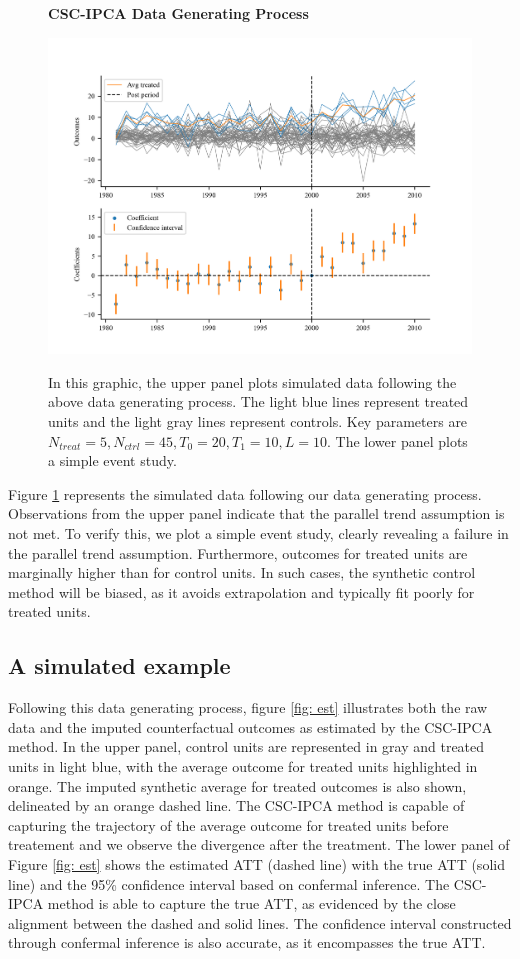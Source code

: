 \documentclass[12pt]{article}
\begin{document}
\begin{figure}[!ht]
    \centering
    \caption{\textbf{CSC-IPCA Data Generating Process}}
    \includegraphics{figs/data_plot.png}
    \label{fig: sim}
    \caption*{\footnotesize{In this graphic, the upper panel plots simulated data following the above data generating process. The light blue lines represent treated units and the light gray lines represent controls. Key parameters are $N_{treat} = 5, N_{ctrl} = 45, T_0=20, T_1=10, L=10$. The lower panel plots a simple event study.}}
    \end{figure}

Figure \ref{fig: sim} represents the simulated data following our data generating process. Observations from the upper panel indicate that the parallel trend assumption is not met. To verify this, we plot a simple event study, clearly revealing a failure in the parallel trend assumption. Furthermore, outcomes for treated units are marginally higher than for control units. In such cases, the synthetic control method will be biased, as it avoids extrapolation and typically fit poorly for treated units.

\subsection{A simulated example}
Following this data generating process, figure \ref{fig: est} illustrates both the raw data and the imputed counterfactual outcomes as estimated by the CSC-IPCA method. In the upper panel, control units are represented in gray and treated units in light blue, with the average outcome for treated units highlighted in orange. The imputed synthetic average for treated outcomes is also shown, delineated by an orange dashed line. The CSC-IPCA method is capable of capturing the trajectory of the average outcome for treated units before treatement and we observe the divergence after the treatment. The lower panel of Figure \ref{fig: est} shows the estimated ATT (dashed line) with the true ATT (solid line) and the 95\% confidence interval based on confermal inference. The CSC-IPCA method is able to capture the true ATT, as evidenced by the close alignment between the dashed and solid lines. The confidence interval constructed through confermal inference is also accurate, as it encompasses the true ATT.
\end{document}
